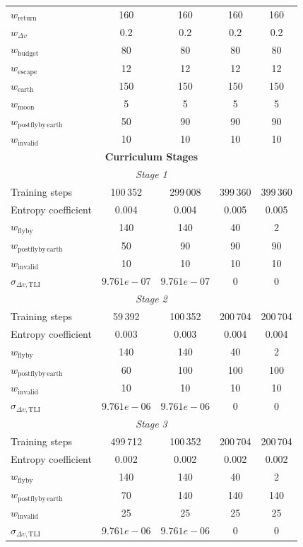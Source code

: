 \begin{table}[!t]
\begin{tabular*}{\textwidth}{@{\extracolsep{\fill}}lcccc}
$w_{\mathrm{return}}$ & 160 & 160 & 160 & 160\\
$w_{\Delta v}$ & 0.2 & 0.2 & 0.2 & 0.2\\
$w_{\mathrm{budget}}$ & 80 & 80 & 80 & 80\\
$w_{\mathrm{escape}}$ & 12 & 12 & 12 & 12\\
$w_{\mathrm{earth}}$ & 150 & 150 & 150 & 150\\
$w_{\mathrm{moon}}$ & 5 & 5 & 5 & 5\\
$w_{\mathrm{postflyby\,earth}}$ & 50 & 90 & 90 & 90\\
$w_{\mathrm{invalid}}$ & 10 & 10 & 10 & 10\\
\midrule
\multicolumn{5}{c}{\textbf{Curriculum Stages}}\\
\midrule
\multicolumn{5}{c}{\textit{Stage 1}}\\
\midrule
Training steps & 100\,352 & 299\,008 & 399\,360 & 399\,360\\
Entropy coefficient & 0.004 & 0.004 & 0.005 & 0.005\\
$w_{\mathrm{flyby}}$ & 140 & 140 & 40 & 2\\
$w_{\mathrm{postflyby\,earth}}$ & 50 & 90 & 90 & 90\\
$w_{\mathrm{invalid}}$ & 10 & 10 & 10 & 10\\
$\sigma_{\Delta v,\mathrm{TLI}}$ & $9.761e-07$ & $9.761e-07$ & 0 & 0\\
\midrule
\multicolumn{5}{c}{\textit{Stage 2}}\\
\midrule
Training steps & 59\,392 & 100\,352 & 200\,704 & 200\,704\\
Entropy coefficient & 0.003 & 0.003 & 0.004 & 0.004\\
$w_{\mathrm{flyby}}$ & 140 & 140 & 40 & 2\\
$w_{\mathrm{postflyby\,earth}}$ & 60 & 100 & 100 & 100\\
$w_{\mathrm{invalid}}$ & 10 & 10 & 10 & 10\\
$\sigma_{\Delta v,\mathrm{TLI}}$ & $9.761e-06$ & $9.761e-06$ & 0 & 0\\
\midrule
\multicolumn{5}{c}{\textit{Stage 3}}\\
\midrule
Training steps & 499\,712 & 100\,352 & 200\,704 & 200\,704\\
Entropy coefficient & 0.002 & 0.002 & 0.002 & 0.002\\
$w_{\mathrm{flyby}}$ & 140 & 140 & 40 & 2\\
$w_{\mathrm{postflyby\,earth}}$ & 70 & 140 & 140 & 140\\
$w_{\mathrm{invalid}}$ & 25 & 25 & 25 & 25\\
$\sigma_{\Delta v,\mathrm{TLI}}$ & $9.761e-06$ & $9.761e-06$ & 0 & 0\\
\bottomrule
\end{tabular*}
\end{table}


